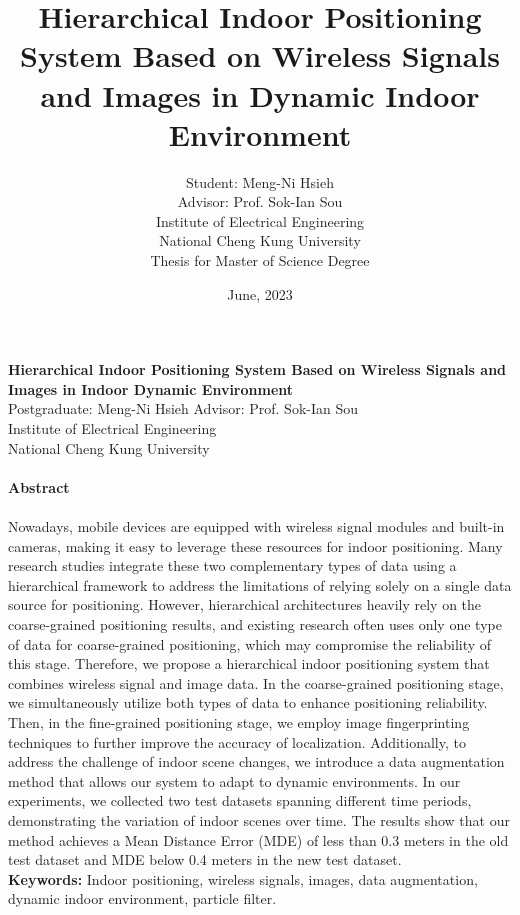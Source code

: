 \documentclass[a4paper,12pt]{report}
\title{Hierarchical Indoor Positioning System Based on Wireless Signals and Images in Dynamic Indoor Environment}
\author{Student: Meng-Ni Hsieh \\
Advisor: Prof. Sok-Ian Sou\\
Institute of Electrical Engineering  \\
National Cheng Kung University \\
Thesis for Master of Science Degree \\
}
\date{June, 2023}
\begin{document}
\maketitle
\begin{titlepage}
    \begin{center}
        {\bf\large Hierarchical Indoor Positioning System Based on Wireless Signals and Images in Indoor Dynamic Environment}\\
        {Postgraduate: Meng-Ni Hsieh \hspace{8mm} Advisor: Prof. Sok-Ian Sou}\\
        {Institute of Electrical Engineering}\\
        {National Cheng Kung University}\\
    \end{center}

    \paragraph{}
    \begin{center}
        {\bf Abstract}
    \end{center}
    \paragraph{}
    Nowadays, mobile devices are equipped with wireless signal modules and built-in cameras, making it easy to leverage these resources for indoor positioning. Many research studies integrate these two complementary types of data using a hierarchical framework to address the limitations of relying solely on a single data source for positioning. However, hierarchical architectures heavily rely on the coarse-grained positioning results, and existing research often uses only one type of data for coarse-grained positioning, which may compromise the reliability of this stage. Therefore, we propose a hierarchical indoor positioning system that combines wireless signal and image data. In the coarse-grained positioning stage, we simultaneously utilize both types of data to enhance positioning reliability. Then, in the fine-grained positioning stage, we employ image fingerprinting techniques to further improve the accuracy of localization. Additionally, to address the challenge of indoor scene changes, we introduce a data augmentation method that allows our system to adapt to dynamic environments. In our experiments, we collected two test datasets spanning different time periods, demonstrating the variation of indoor scenes over time. The results show that our method achieves a Mean Distance Error (MDE) of less than 0.3 meters in the old test dataset and MDE below 0.4 meters in the new test dataset.\\
    
    \textbf{Keywords:} {Indoor positioning, wireless signals, images, data augmentation, dynamic indoor environment, particle filter.}
\end{titlepage}
\end{document}
